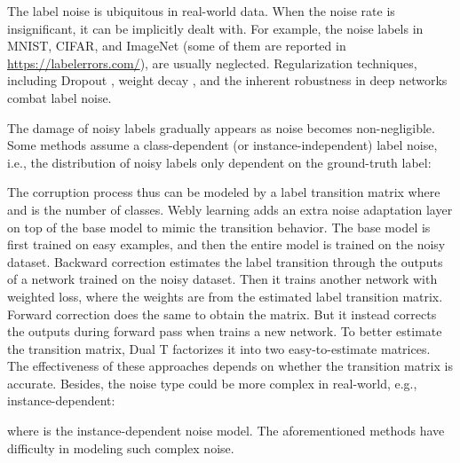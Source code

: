\documentclass[letterpaper]{article} \usepackage{aaai23}  \usepackage{times}  \usepackage{helvet}  \usepackage{courier}  \usepackage[hyphens]{url}  \usepackage{graphicx} \urlstyle{rm} \def\UrlFont{\rm}  \usepackage{natbib}  \usepackage{caption} \frenchspacing  \setlength{\pdfpagewidth}{8.5in} \setlength{\pdfpageheight}{11in} \usepackage{algorithm}
\begin{document}
The label noise is ubiquitous in real-world data.
When the noise rate is insignificant, it can be implicitly dealt with.
For example, the noise labels in MNIST, CIFAR, and ImageNet (some of them are reported in \url{https://labelerrors.com/}), are usually neglected.
Regularization techniques, including Dropout \cite{srivastava2014dropout}, weight decay \cite{krogh1992simple}, and the inherent robustness in deep networks \cite{zhang2016understanding} combat label noise.

The damage of noisy labels gradually appears as noise becomes non-negligible.
Some methods assume a class-dependent (or instance-independent) label noise, i.e., the distribution of noisy labels only dependent on the ground-truth label:

The corruption process thus can be modeled by a label transition matrix  where  and  is the number of classes.
Webly learning \cite{chen2015webly} adds an extra noise adaptation layer on top of the base model to mimic the transition behavior.
The base model is first trained on easy examples, and then the entire model is trained on the noisy dataset.  
Backward correction \cite{patrini2017making} estimates the label transition through the outputs of a network trained on the noisy dataset.
Then it trains another network with weighted loss, where the weights are from the estimated label transition matrix.
Forward correction \cite{patrini2017making} does the same to obtain the matrix. 
But it instead corrects the outputs during forward pass when trains a new network.
To better estimate the transition matrix, Dual T \cite{yao2020dual} factorizes it into two easy-to-estimate matrices.
The effectiveness of these approaches depends on whether the transition matrix is accurate. 
Besides, the noise type could be more complex in real-world, e.g., instance-dependent:

where  is the instance-dependent noise model.
The aforementioned methods have difficulty in modeling such complex noise.
\end{document}
